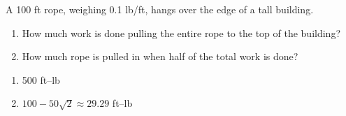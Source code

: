 {A 100 ft rope, weighing 0.1 lb/ft, hangs over the edge of a tall building.
	\begin{enumerate}
	\item		How much work is done pulling the entire rope to the top of the building?
	\item		How much rope is pulled in when half of the total work is done?
	\end{enumerate}}
{\begin{enumerate}
	\item 	500 ft--lb
	\item		$100-50\sqrt{2} \approx 29.29$ ft--lb
	\end{enumerate}
}
